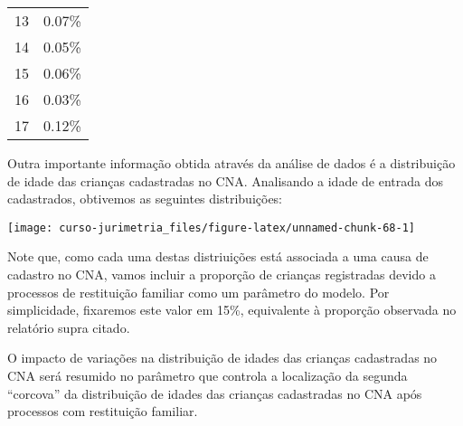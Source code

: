 \documentclass[]{book}
\begin{document}
\begin{longtable}[]{@{}cc@{}}
\begin{minipage}[t]{0.10\columnwidth}
13
\strut\end{minipage} &
\begin{minipage}[t]{0.14\columnwidth}\centering\strut
0.07\%
\strut\end{minipage}\tabularnewline
\begin{minipage}[t]{0.10\columnwidth}\centering\strut
14
\strut\end{minipage} &
\begin{minipage}[t]{0.14\columnwidth}\centering\strut
0.05\%
\strut\end{minipage}\tabularnewline
\begin{minipage}[t]{0.10\columnwidth}\centering\strut
15
\strut\end{minipage} &
\begin{minipage}[t]{0.14\columnwidth}\centering\strut
0.06\%
\strut\end{minipage}\tabularnewline
\begin{minipage}[t]{0.10\columnwidth}\centering\strut
16
\strut\end{minipage} &
\begin{minipage}[t]{0.14\columnwidth}\centering\strut
0.03\%
\strut\end{minipage}\tabularnewline
\begin{minipage}[t]{0.10\columnwidth}\centering\strut
17
\strut\end{minipage} &
\begin{minipage}[t]{0.14\columnwidth}\centering\strut
0.12\%
\strut\end{minipage}\tabularnewline
\bottomrule
\end{longtable}

Outra importante informação obtida através da análise de dados é a
distribuição de idade das crianças cadastradas no CNA. Analisando a
idade de entrada dos cadastrados, obtivemos as seguintes distribuições:

\begin{center}\texttt{[image: curso-jurimetria\_files/figure-latex/unnamed-chunk-68-1]} \end{center}

Note que, como cada uma destas distriuições está associada a uma causa
de cadastro no CNA, vamos incluir a proporção de crianças registradas
devido a processos de restituição familiar como um parâmetro do modelo.
Por simplicidade, fixaremos este valor em 15\%, equivalente à proporção
observada no relatório supra citado.

O impacto de variações na distribuição de idades das crianças
cadastradas no CNA será resumido no parâmetro que controla a localização
da segunda ``corcova'' da distribuição de idades das crianças
cadastradas no CNA após processos com restituição familiar.
\end{document}
